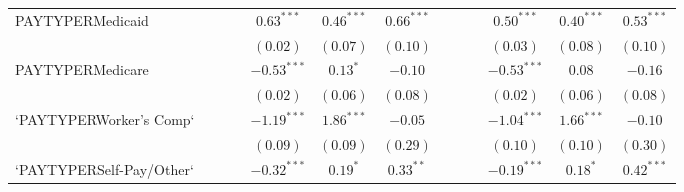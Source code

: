 \documentclass[12pt,twoside]{reedthesis}
\begin{document}
\begin{table}
\begin{center}
\begin{tiny}
\begin{tabular}{l@{} c@{} c@{} c@{} c@{} c@{} c@{} c@{} c@{} c@{} c@{} c@{} c@{} }
  PAYTYPERMedicaid                   &                        &                        &                        & $\mathbf{0.63}^{***}$  & $\mathbf{0.46}^{***}$  & $\mathbf{0.66}^{***}$  &                        &                        &                        & $\mathbf{0.50}^{***}$  & $\mathbf{0.40}^{***}$  & $\mathbf{0.53}^{***}$  \\
                                     &                        &                        &                        & $(0.02)$               & $(0.07)$               & $(0.10)$               &                        &                        &                        & $(0.03)$               & $(0.08)$               & $(0.10)$               \\
  PAYTYPERMedicare                   &                        &                        &                        & $\mathbf{-0.53}^{***}$ & $0.13^{*}$             & $-0.10$                &                        &                        &                        & $\mathbf{-0.53}^{***}$ & $0.08$                 & $-0.16$                \\
                                     &                        &                        &                        & $(0.02)$               & $(0.06)$               & $(0.08)$               &                        &                        &                        & $(0.02)$               & $(0.06)$               & $(0.08)$               \\
  `PAYTYPERWorker's Comp`            &                        &                        &                        & $\mathbf{-1.19}^{***}$ & $\mathbf{1.86}^{***}$  & $-0.05$                &                        &                        &                        & $\mathbf{-1.04}^{***}$ & $\mathbf{1.66}^{***}$  & $-0.10$                \\
                                     &                        &                        &                        & $(0.09)$               & $(0.09)$               & $(0.29)$               &                        &                        &                        & $(0.10)$               & $(0.10)$               & $(0.30)$               \\
  `PAYTYPERSelf-Pay/Other`           &                        &                        &                        & $\mathbf{-0.32}^{***}$ & $0.19^{*}$             & $0.33^{**}$            &                        &                        &                        & $\mathbf{-0.19}^{***}$ & $0.18^{*}$             & $\mathbf{0.42}^{***}$  \\

\end{tabular}
\end{tiny}
\end{center}
\end{table}
\end{document}
